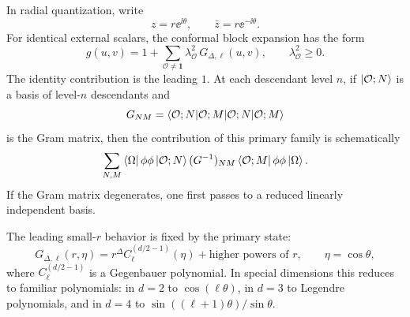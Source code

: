 In radial quantization, write
\[
  z=r\ee^{\ii\theta},\qquad
  \bar z=r\ee^{-\ii\theta}.
\]
For identical external scalars, the conformal block expansion has the
form
\[
  g(u,v)=1+\sum_{\mathcal O\ne\mathbf1}
  \lambda_{\mathcal O}^2\,G_{\Delta,\ell}(u,v),
  \qquad
  \lambda_{\mathcal O}^2\ge0.
\]
The identity contribution is the leading \(1\).  At each descendant
level \(n\), if \(\ket{\mathcal O;N}\) is a basis of level-\(n\)
descendants and
\[
  G_{NM}=\braket{\mathcal O;N|\mathcal O;M}
\]
is the Gram matrix, then the contribution of this primary family is
schematically
\[
  \sum_{N,M}
  \bra{\Omega}\phi\phi\ket{\mathcal O;N}
  (G^{-1})_{NM}
  \bra{\mathcal O;M}\phi\phi\ket{\Omega}.
\]
If the Gram matrix degenerates, one first passes to a reduced linearly
independent basis.

The leading small-\(r\) behavior is fixed by the primary state:
\[
  G_{\Delta,\ell}(r,\eta)
  =
  r^\Delta C_\ell^{(d/2-1)}(\eta)
  +\text{higher powers of }r,
  \qquad
  \eta=\cos\theta,
\]
where \(C_\ell^{(d/2-1)}\) is a Gegenbauer polynomial.  In special
dimensions this reduces to familiar polynomials: in \(d=2\) to
\(\cos(\ell\theta)\), in \(d=3\) to Legendre polynomials, and in \(d=4\)
to \(\sin((\ell+1)\theta)/\sin\theta\).

